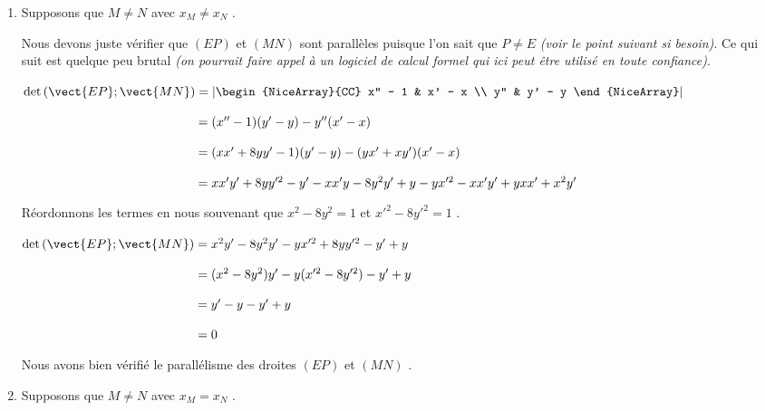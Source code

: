 \begin{enumerate}
	\item Supposons que $M \neq N$ avec $x_M \neq x_N$ .
	
	\smallskip
	
	\noindent
	Nous devons juste vérifier que $(EP)$ et $(MN)$ sont parallèles puisque l'on sait que $P \neq E$ \textit{(voir le point suivant si besoin)}. Ce qui suit est quelque peu brutal \textit{(on pourrait faire appel à un logiciel de calcul formel qui ici peut être utilisé en toute confiance)}.
	
	\smallskip
	
	\noindent
	$\det\left ( \vect{EP} ; \vect{MN} \right)
	=
	\left|\begin{NiceArray}{CC} 
	  x'' - 1 & x' - x \\ 
	  y''     & y' - y
	\end{NiceArray}\right|$
	
	\noindent
	$\phantom{\det\left ( \vect{EP} ; \vect{MN} \right)}
	=
	(x'' - 1)(y' - y) -  y'' (x' - x)$
	
	\noindent
	$\phantom{\det\left ( \vect{EP} ; \vect{MN} \right)}
	=
	(x x' + 8 y y' - 1)(y' - y) -  (y x' + x y') (x' - x)$
	
	\noindent
	$\phantom{\det\left ( \vect{EP} ; \vect{MN} \right)}
	=
	x x' y' + 8 y y'^2 - y' - x x' y - 8 y^2 y' + y
	- 
	y x'^2 - x x' y' + y x x' + x^2 y'$
	
	\smallskip
	
	\noindent
	Réordonnons les termes en nous souvenant que $x^2 - 8 y^2 = 1$ et $x'^2 - 8 y'^2 = 1$ .

	\smallskip
	
	\noindent
	${\det\left ( \vect{EP} ; \vect{MN} \right)}
	=
	x^2 y' - 8 y^2 y'
	- y x'^2 + 8 y y'^2
	- y' + y$
	
	\noindent
	$\phantom{\det\left ( \vect{EP} ; \vect{MN} \right)}
	=
	(x^2 - 8 y^2)y'
	- y(x'^2 - 8 y'^2)
	- y' + y$
	
	\noindent
	$\phantom{\det\left ( \vect{EP} ; \vect{MN} \right)}
	=
	y'
	- y
	- y' + y$
	
	\noindent
	$\phantom{\det\left ( \vect{EP} ; \vect{MN} \right)}
	=
	0$
	
	\smallskip
	
	\noindent
	Nous avons bien vérifié le parallélisme des droites $(EP)$ et $(MN)$ .


	\medskip
	\item Supposons que $M \neq N$ avec $x_M = x_N$ .
	

\end{enumerate}
